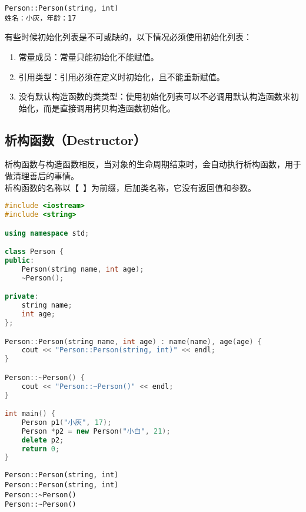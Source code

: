 \begin{tcolorbox}
	\begin{verbatim}
Person::Person(string, int)
姓名：小灰，年龄：17
	\end{verbatim}
\end{tcolorbox}

有些时候初始化列表是不可或缺的，以下情况必须使用初始化列表：

\begin{enumerate}
	\item 常量成员：常量只能初始化不能赋值。

	\item 引用类型：引用必须在定义时初始化，且不能重新赋值。

	\item 没有默认构造函数的类类型：使用初始化列表可以不必调用默认构造函数来初始化，而是直接调用拷贝构造函数初始化。
\end{enumerate}

\vspace{0.5cm}

\subsection{析构函数（Destructor）}

析构函数与构造函数相反，当对象的生命周期结束时，会自动执行析构函数，用于做清理善后的事情。\\

析构函数的名称以【~】为前缀，后加类名称，它没有返回值和参数。\\


\begin{lstlisting}[language=C++]
#include <iostream>
#include <string>

using namespace std;

class Person {
public:
    Person(string name, int age);
    ~Person();

private:
    string name;
    int age;
};

Person::Person(string name, int age) : name(name), age(age) {
    cout << "Person::Person(string, int)" << endl;
}

Person::~Person() {
    cout << "Person::~Person()" << endl;
}

int main() {
    Person p1("小灰", 17);
    Person *p2 = new Person("小白", 21);
    delete p2;
    return 0;
}
\end{lstlisting}

\begin{tcolorbox}
	\begin{verbatim}
Person::Person(string, int)
Person::Person(string, int)
Person::~Person()
Person::~Person()
	\end{verbatim}
\end{tcolorbox}

